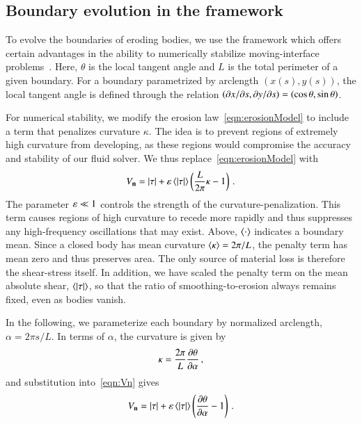 \documentclass[preprint, 10pt]{elsarticle}
\begin{document}
\subsection{Boundary evolution in the {\thL} framework} 
\label{sec:thetaL}

To evolve the boundaries of eroding bodies, we use the {\thL} framework which offers certain advantages in the ability to numerically stabilize moving-interface problems~\cite{hou-low-she1994}. Here, $\theta$ is the local tangent angle and $L$ is the total perimeter of a given boundary. For a boundary parametrized by arclength $(x(s),y(s))$, the local tangent angle is defined through the relation $\left( \partial {x}/\partial {s}, \partial {y}/\partial {s} \right) = \left(\cos \theta, \sin \theta \right)$.

For numerical stability, we modify the erosion law~\eqref{eqn:erosionModel} to include a term that penalizes curvature $\kappa$. The idea is to prevent regions of extremely high curvature from developing, as these regions would compromise the accuracy and stability of our fluid solver. We thus replace~\eqref{eqn:erosionModel} with
\begin{align}
  \label{eqn:Vn}
  V_{\mathbf{n}} = \lvert \tau \rvert + \varepsilon \left< \lvert \tau \rvert \right> \left( \frac{L }{2\pi} \kappa - 1
  \right) \, .
\end{align}
The parameter $\varepsilon \ll 1$ controls the strength of the curvature-penalization. This term causes regions of high curvature to recede more rapidly and thus suppresses any high-frequency oscillations that may exist. Above, $\left< \cdot \right>$ indicates a boundary mean. Since a closed body has mean curvature $\left< \kappa \right> = 2\pi / L$, the penalty term has mean zero and thus preserves area. The only source of material loss is therefore the shear-stress itself. In addition, we have scaled the penalty term on the mean absolute shear, $\left< \lvert \tau \rvert \right>$, so that the ratio of smoothing-to-erosion always remains fixed, even as bodies vanish.

In the following, we parameterize each boundary by normalized arclength, $\alpha = 2 \pi s / L$. In terms of $\alpha$, the curvature is given by
\begin{align}
\kappa = \frac{2 \pi}{L} \frac{\partial \theta}{\partial \alpha} \, ,
\end{align}
and substitution into~\eqref{eqn:Vn} gives
\begin{align}
\label{eqn:Vn2}
V_{\mathbf{n}} = \lvert \tau \rvert +  \varepsilon \left< \lvert \tau \rvert \right>   \left(\frac{\partial \theta}{\partial \alpha} - 1 \right) \, .
\end{align}
\end{document}
